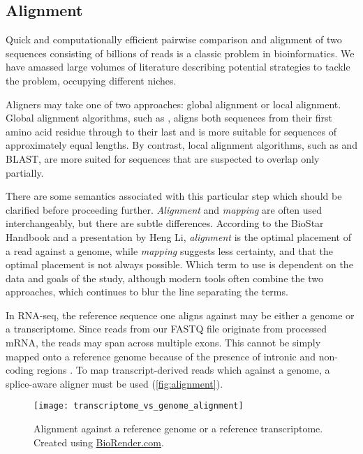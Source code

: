 \subsection{Alignment}

Quick and computationally efficient pairwise comparison and alignment of two sequences consisting of billions of reads is a classic problem in bioinformatics. We have amassed large volumes of literature describing potential strategies to tackle the problem, occupying different niches.

Aligners may take one of two approaches: global alignment or local alignment. Global alignment algorithms, such as \cite{needleman1970general}, aligns both sequences from their first amino acid residue through to their last and is more suitable for sequences of approximately equal lengths. By contrast, local alignment algorithms, such as \cite{smith1981identification} and BLAST, are more suited for sequences that are suspected to overlap only partially. 

There are some semantics associated with this particular step which should be clarified before proceeding further. \textit{Alignment} and \textit{mapping} are often used interchangeably, but there are subtle differences. According to the BioStar Handbook \citep{albert2020biostar} and a presentation by Heng Li, \textit{alignment} is the optimal placement of a read against a genome, while \textit{mapping} suggests less certainty, and that the optimal placement is not always possible. Which term to use is dependent on the data and goals of the study, although modern tools often combine the two approaches, which continues to blur the line separating the terms.

In RNA-seq, the reference sequence one aligns against may be either a genome or a transcriptome. Since reads from our FASTQ file originate from processed mRNA, the reads may span across multiple exons. This cannot be simply mapped onto a reference genome because of the presence of intronic and non-coding regions \citep{rnadataanalysis2020}. To map transcript-derived reads which against a genome, a splice-aware aligner must be used (\autoref{fig:alignment}).

\begin{figure}[!ht]
    \centering
    \texttt{[image: transcriptome\_vs\_genome\_alignment]}
    \caption[Alignment against a reference genome or a reference transcriptome]{Alignment against a reference genome or a reference transcriptome. Created using \href{https://biorender.com/}{BioRender.com}. } 
    \label{fig:alignment}
\end{figure}
\clearpage

